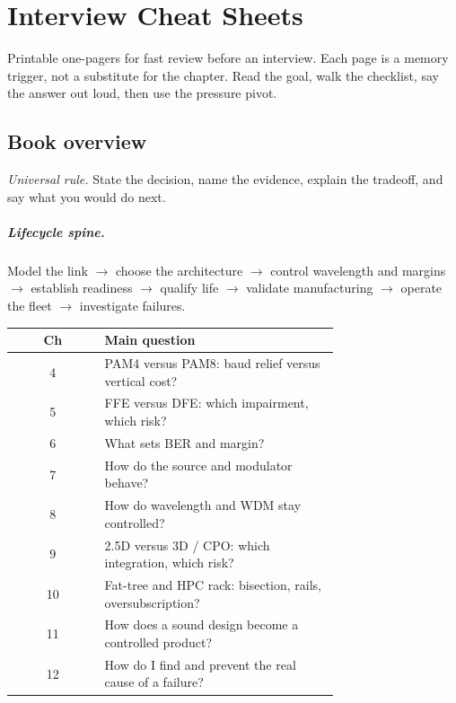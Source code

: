 \chapter{Interview Cheat Sheets}
\label{app:interview-cheatsheets}

Printable one-pagers for fast review before an interview. Each page is a memory
trigger, not a substitute for the chapter. Read the goal, walk the checklist,
say the answer out loud, then use the pressure pivot.

\small

\section{Book overview}
\label{sec:cheat-overview}

\textit{Universal rule.} State the decision, name the evidence, explain the
tradeoff, and say what you would do next.

\paragraph{Lifecycle spine.}
Model the link $\rightarrow$ choose the architecture $\rightarrow$ control
wavelength and margins $\rightarrow$ establish readiness $\rightarrow$ qualify
life $\rightarrow$ validate manufacturing $\rightarrow$ operate the fleet
$\rightarrow$ investigate failures.

\begin{center}
\footnotesize
\begin{tabular}{@{}cp{0.72\linewidth}@{}}
\toprule
Ch & Main question \\
\midrule
4 & PAM4 versus PAM8: baud relief versus vertical cost? \\
5 & FFE versus DFE: which impairment, which risk? \\
6 & What sets BER and margin? \\
7 & How do the source and modulator behave? \\
8 & How do wavelength and WDM stay controlled? \\
9 & 2.5D versus 3D / CPO: which integration, which risk? \\
10 & Fat-tree and HPC rack: bisection, rails, oversubscription? \\
11 & How does a sound design become a controlled product? \\
12 & How do I find and prevent the real cause of a failure? \\
\bottomrule
\end{tabular}
\end{center}

